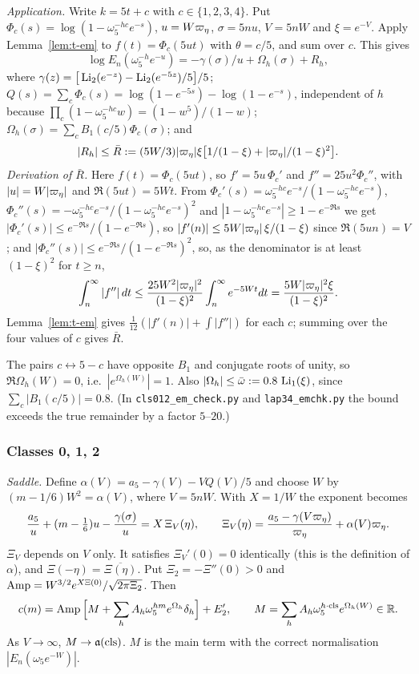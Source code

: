 \emph{Application.} Write $k=5t+c$ with $c\in\{1,2,3,4\}$. Put $\Phi_c(s)=\log(1-\omega_5^{-hc}e^{-s})$, $u=W\varpi_\eta$,
$\sigma=5nu$, $V=5nW$ and $\xi=e^{-V}$. Apply Lemma~\ref{lem:t-em} to $f(t)=\Phi_c(5ut)$ with $\theta=c/5$, and sum over
$c$. This gives
\[
\log E_n(\omega_5^{-h}e^{-u})=-\gamma(\sigma)/u+\Omega_h(\sigma)+R_h,
\]
where $\gamma(z)=\big[\operatorname{Li}_2(e^{-z})-\operatorname{Li}_2(e^{-5z})/5\big]/5$;
$Q(s)=\sum_c\Phi_c(s)=\log(1-e^{-5s})-\log(1-e^{-s})$, independent of $h$ because
$\prod_c(1-\omega_5^{-hc}w)=(1-w^5)/(1-w)$; $\Omega_h(\sigma)=\sum_cB_1(c/5)\Phi_c(\sigma)$; and
\[
|R_h|\le\bar R:=(5W/3)|\varpi_\eta|\xi\big[1/(1-\xi)+|\varpi_\eta|/(1-\xi)^2\big].
\]
\emph{Derivation of $\bar R$.} Here $f(t)=\Phi_c(5ut)$, so $f'=5u\,\Phi_c'$ and $f''=25u^2\Phi_c''$, with
$|u|=W|\varpi_\eta|$ and $\Re(5ut)=5Wt$. From $\Phi_c'(s)=\omega_5^{-hc}e^{-s}/(1-\omega_5^{-hc}e^{-s})$,
$\Phi_c''(s)=-\omega_5^{-hc}e^{-s}/(1-\omega_5^{-hc}e^{-s})^2$ and $|1-\omega_5^{-hc}e^{-s}|\ge1-e^{-\Re s}$ we get
$|\Phi_c'(s)|\le e^{-\Re s}/(1-e^{-\Re s})$, so $|f'(n)|\le5W|\varpi_\eta|\,\xi/(1-\xi)$ since $\Re(5un)=V$; and
$|\Phi_c''(s)|\le e^{-\Re s}/(1-e^{-\Re s})^2$, so, as the denominator is at least $(1-\xi)^2$ for $t\ge n$,
\[
\int_n^\infty|f''|\,dt\le\frac{25W^2|\varpi_\eta|^2}{(1-\xi)^2}\int_n^\infty e^{-5Wt}dt=\frac{5W|\varpi_\eta|^2\xi}{(1-\xi)^2}.
\]
Lemma~\ref{lem:t-em} gives $\tfrac1{12}(|f'(n)|+\int|f''|)$ for each $c$; summing over the four values of $c$ gives $\bar R$.

The pairs $c\leftrightarrow5-c$ have opposite $B_1$ and conjugate roots of unity, so $\Re\Omega_h(W)=0$, i.e.\
$|e^{\Omega_h(W)}|=1$. Also $|\Omega_h|\le\bar\omega:=0.8\,\operatorname{Li}_1(\xi)$, since $\sum_c|B_1(c/5)|=0.8$. (In
\texttt{cls012\_em\_check.py} and \texttt{lap34\_emchk.py} the bound exceeds the true remainder by a factor $5$--$20$.)

\subsubsection{Classes 0, 1, 2}\label{sec:lap012}

\emph{Saddle.} Define $\alpha(V)=a_5-\gamma(V)-VQ(V)/5$ and choose $W$ by $(m-1/6)W^2=\alpha(V)$, where $V=5nW$. With
$X=1/W$ the exponent becomes
\[
\frac{a_5}u+(m-\tfrac16)u-\frac{\gamma(\sigma)}u=X\,\Xi_V(\eta),\qquad\Xi_V(\eta)=\frac{a_5-\gamma(V\varpi_\eta)}{\varpi_\eta}+\alpha(V)\varpi_\eta .
\]
$\Xi_V$ depends on $V$ only. It satisfies $\Xi_V'(0)=0$ identically (this is the definition of $\alpha$), and
$\Xi(-\eta)=\overline{\Xi(\eta)}$. Put $\Xi_2=-\Xi''(0)>0$ and $\operatorname{Amp}=W^{3/2}e^{X\Xi(0)}/\sqrt{2\pi\Xi_2}$. Then
\[
c(m)=\operatorname{Amp}\Big[M+\sum_hA_h\omega_5^{hm}e^{\Omega_h}\delta_h\Big]+E_2',\qquad
M=\sum_hA_h\omega_5^{h\cdot\mathrm{cls}}e^{\Omega_h(W)}\in\mathbb R .
\]
As $V\to\infty$, $M\to\mathfrak a(\mathrm{cls})$. $M$ is the main term with the correct normalisation $|E_n(\omega_5e^{-W})|$.


